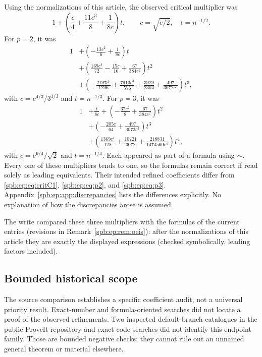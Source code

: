 Using the normalizations of this article, the observed critical multiplier
was
\[
 1+\left(\frac c4+\frac{11c^3}{8}+\frac1{8c}\right)t,
 \qquad c=\sqrt{e/2},\quad t=n^{-1/2}.
\]
For $p=2$, it was
\begin{align*}
 1&+\left(-\frac{13c^2}{6}+\frac1{8c}\right)t\\
  &+\left(\frac{169c^4}{72}-\frac{15c}{16}
                               +\frac{67}{384c^2}\right)t^2\\
  &+\left(-\frac{2197c^6}{1296}+\frac{7913c^3}{576}
                +\frac{3929}{2304}+\frac{497}{3072c^3}\right)t^3,
\end{align*}
with $c=e^{4/3}/3^{1/3}$ and $t=n^{-1/3}$.
For $p=3$, it was
\begin{align*}
 1&+\frac{t}{8c}
 +\left(-\frac{37c^2}{8}+\frac{67}{384c^2}\right)t^2\\
  &+\left(-\frac{205c}{64}+\frac{497}{3072c^3}\right)t^3\\
  &+\left(\frac{1369c^4}{128}+\frac{10721}{3072}
                      +\frac{218831}{1474560c^4}\right)t^4,
\end{align*}
with $c=e^{9/4}/\sqrt2$ and $t=n^{-1/4}$.
Each appeared as part of a formula using $\sim$.
Every one of these multipliers tends to one, so the formulas remain
correct if read solely as leading equivalents. Their intended refined
coefficients differ from \eqref{spb:ep:eq:critC1}, \eqref{spb:ep:eq:p2}, and
\eqref{spb:ep:eq:p3}. Appendix~\ref{spb:ep:app:discrepancies} lists the differences explicitly.
No explanation of how the discrepancies arose is assumed.
\begin{writenote}[7 October 2026]
The write compared these three multipliers with the formulas of the current
entries (revisions in Remark~\ref{spb:ep:rem:oeis}): after the normalizations
of this article they are exactly the displayed expressions (checked
symbolically, leading factors included).
\end{writenote}

\subsection{Bounded historical scope}
The source comparison establishes a specific coefficient audit, not a
universal priority result. Exact-number and formula-oriented searches did
not locate a proof of the observed refinements. Two inspected default-branch
catalogues in the public ProveIt repository and exact code searches did
not identify this endpoint family. Those are bounded negative checks;
they cannot rule out an unnamed general theorem or material elsewhere.

